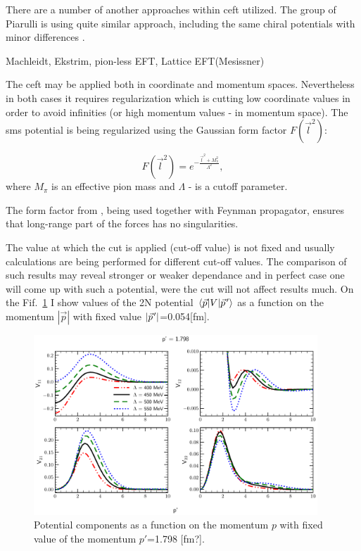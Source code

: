 There are a number of another approaches within \gls{ceft} utilized.
The group of Piarulli is using quite similar approach, including
the same chiral potentials with minor differences \cite{Piarulli2012,Piarulli2015}.

{\color{red} Machleidt, Ekstrim, pion-less EFT, Lattice EFT(Mesissner)}


The \gls{ceft} may be applied both in coordinate and momentum spaces.
Nevertheless in both cases it requires regularization which is cutting 
low coordinate values in order to avoid infinities 
(or high momentum values - in momentum space). 
The \gls{sms} potential is being regularized using the Gaussian form factor
$F(\vec{l}^2)$:

\begin{equation}
    F(\vec{l}^2) = e^{-\frac{\vec{l}^2 + M_\pi^2}{\Lambda^2}},
    \label{regulator}
\end{equation}
where $M_\pi$ is an effective pion mass and $\Lambda$ - is a cutoff parameter.

The form factor from , being used together with Feynman propagator,
ensures that long-range part of the forces has no singularities. 

The value at which
the cut is applied (cut-off value) is not fixed and usually calculations
are being performed for different cut-off values. The comparison
of such results may reveal stronger or weaker dependance and in perfect
case one will come up with such a potential, were the cut will
not affect results much. On the Fif.~\ref{potential_cutoff} 
I show values of the 2N potential $\matrixel{\vec{p}}{V}{\pvec{p}}$
as a function on the momentum $|\vec{p}|$ with fixed value $|\pvec{p}|$=0.054[fm].



\begin{figure}[htb]
    \begin{center}
    \includegraphics[width=0.95\textwidth]{PlotData/Deuteron/WAVEFUNC/potential_pp1.798.pdf}
    \end{center}
    \caption{Potential components as a function on the momentum $p$ with fixed
    value of the momentum $p'$=1.798 [fm?].
    }
    \label{potential_cutoff}
\end{figure}



